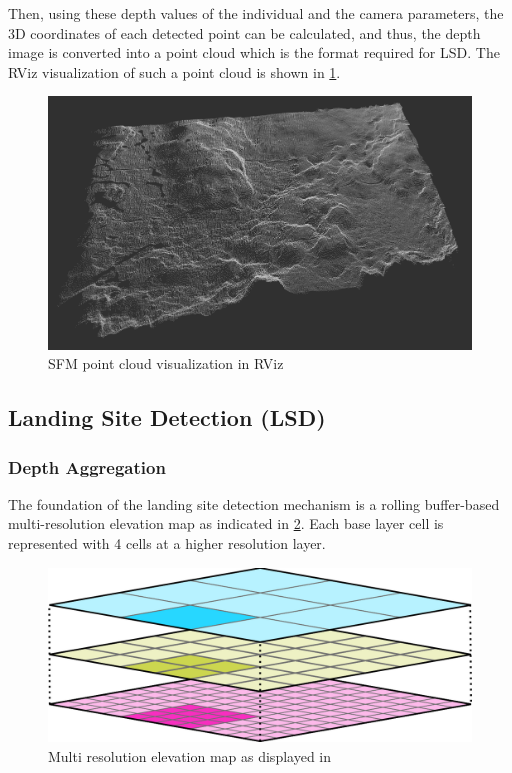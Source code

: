 \documentclass{article}
\begin{document}
Then, using these depth values of the individual and the camera parameters, the 3D coordinates of each detected point can be calculated, and thus, the depth image is converted into a point cloud which is the format required for LSD. The RViz visualization of such a point cloud is shown in \cref{fig:sfm_point_cloud}.


\begin{figure}[h]
\centering
\includegraphics[scale=0.2]{images/system_overview/sfm_depth_map.png}
\caption{SFM point cloud visualization in RViz}
\label{fig:sfm_point_cloud}
\end{figure}

\subsection{Landing Site Detection (LSD)}\label{subsec:setup:LSD}

\subsubsection{Depth Aggregation}\label{subsubsec:setup:aggregation}

The foundation of the landing site detection mechanism is a rolling buffer-based multi-resolution elevation map as indicated in \cref{fig:DEM}. Each base layer cell is represented with 4 cells at a higher resolution layer.

\begin{figure}[ht!]
    \centering
    \includegraphics[scale=0.25]{images/system_overview/DEM.png}
    \caption{Multi resolution elevation map as displayed in \citep{LSD1}}
    \label{fig:DEM}
\end{figure}
\end{document}
